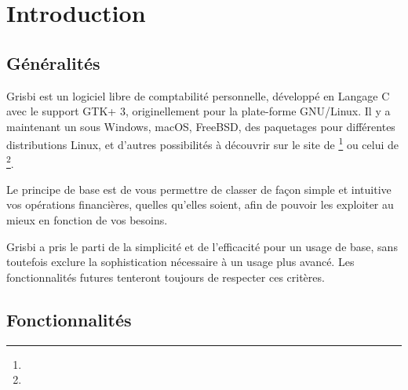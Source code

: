 
\chapter{Introduction\label{introduction}}


\section{Généralités\label{introduction-general}}


Grisbi est un \gls{logiciel libre} de comptabilité personnelle, développé en \gls{Langage C} avec le support \gls{GTK}+ 3, originellement pour la plate-forme \gls{GNU/Linux}. Il y a maintenant un  sous \gls{Windows}, \gls{macOS}, FreeBSD, des paquetages pour différentes \gls{distributions Linux}, et d'autres possibilités à découvrir sur le site de \footnote{\urlGrisbi{}} ou celui de \footnote{\urlSourceForge{}}.

Le principe de base est de vous permettre de classer de façon simple et intuitive vos opérations financières, quelles qu’elles soient, afin de pouvoir les exploiter au mieux en fonction de vos besoins.

Grisbi a pris le parti de la simplicité et de l'efficacité pour un usage de
base, sans toutefois exclure la sophistication nécessaire à un usage plus avancé. Les fonctionnalités futures tenteront toujours de respecter ces critères.


\section{Fonctionnalités\label{introduction-features}}


